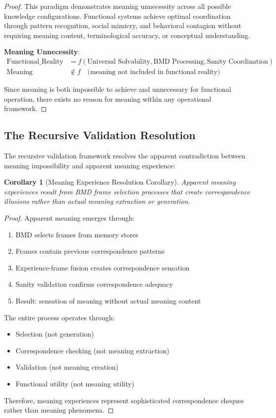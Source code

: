 \documentclass[12pt,a4paper]{article}
\newtheorem{corollary}[theorem]{Corollary}
\begin{document}
\begin{proof}
This paradigm demonstrates meaning unnecessity across all possible knowledge configurations. Functional systems achieve optimal coordination through pattern recognition, social mimicry, and behavioral contagion without requiring meaning content, terminological accuracy, or conceptual understanding.

\textbf{Meaning Unnecessity}:
\begin{align}
\text{Functional\_Reality} &= f(\text{Universal Solvability}, \text{BMD Processing}, \text{Sanity Coordination}) \\
\text{Meaning} &\notin f \quad \text{(meaning not included in functional reality)}
\end{align}

Since meaning is both impossible to achieve and unnecessary for functional operation, there exists no reason for meaning within any operational framework.
\end{proof}

\subsection{The Recursive Validation Resolution}

The recursive validation framework resolves the apparent contradiction between meaning impossibility and apparent meaning experience:

\begin{corollary}[Meaning Experience Resolution Corollary]
Apparent meaning experiences result from BMD frame selection processes that create correspondence illusions rather than actual meaning extraction or generation.
\end{corollary}

\begin{proof}
Apparent meaning emerges through:
\begin{enumerate}
\item BMD selects frames from memory stores
\item Frames contain previous correspondence patterns
\item Experience-frame fusion creates correspondence sensation
\item Sanity validation confirms correspondence adequacy
\item Result: sensation of meaning without actual meaning content
\end{enumerate}

The entire process operates through:
\begin{itemize}
\item Selection (not generation)
\item Correspondence checking (not meaning extraction)  
\item Validation (not meaning creation)
\item Functional utility (not meaning utility)
\end{itemize}

Therefore, meaning experiences represent sophisticated correspondence cheques rather than meaning phenomena.
\end{proof}
\end{document}
